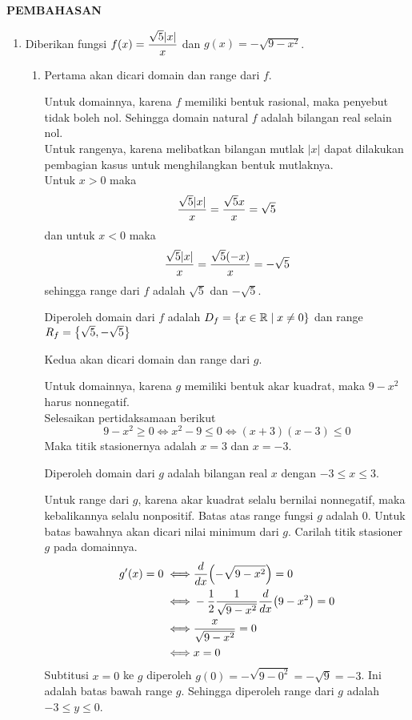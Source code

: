 \begin{center}
\textbf{\large{PEMBAHASAN}}
\end{center}
\begin{enumerate}[leftmargin=*, label={\arabic*}.]
\item Diberikan fungsi $\ds f(x) = \frac{\sqrt{5}\abs{x}}{x}$ dan $g(x) = -\sqrt{9-x^{2}}$.
    \begin{enumerate}[label={\alph*}.]
    \item Pertama akan dicari domain dan range dari $f$.
    
    Untuk domainnya, karena $f$ memiliki bentuk rasional, maka penyebut tidak boleh nol. 
    Sehingga domain natural $f$ adalah bilangan real selain nol.\\
    Untuk rangenya, karena melibatkan bilangan mutlak $|x|$ dapat dilakukan pembagian 
    kasus untuk menghilangkan bentuk mutlaknya.\\
    Untuk $x>0$ maka
    \[
        \frac{\sqrt{5}\abs{x}}{x} = \frac{\sqrt{5}x}{x} = \sqrt{5}
    \]
    dan untuk $x < 0$ maka
    \[
        \frac{\sqrt{5}\abs{x}}{x} = \frac{\sqrt{5}(-x)}{x} = -\sqrt{5}
    \]
    sehingga range dari $f$ adalah $\sqrt{5}$ dan $-\sqrt{5}$.

    Diperoleh domain dari $f$ adalah $D_f=\set*{x\in \mathbb{R} \mid x\neq 0}$ dan 
    range $R_f=\set*{\sqrt{5},-\sqrt{5}}$

    Kedua akan dicari domain dan range dari $g$.

    Untuk domainnya, karena $g$ memiliki bentuk akar kuadrat, maka $9-x^{2}$ harus nonnegatif.\\
    Selesaikan pertidaksamaan berikut
    \[
        9-x^{2} \geq 0 \iff x^{2}-9 \leq 0 \iff (x+3)(x-3) \leq 0
    \]
    Maka titik stasionernya adalah $x=3$ dan $x=-3$.

    
    
    Diperoleh domain dari $g$ adalah bilangan real $x$ dengan $-3 \leq x \leq 3$.

    Untuk range dari $g$, karena akar kuadrat selalu bernilai nonnegatif, maka kebalikannya selalu 
    nonpositif. Batas atas range fungsi $g$ adalah $0$. Untuk batas bawahnya akan dicari nilai minimum 
    dari $g$. Carilah titik stasioner $g$ pada domainnya.
    \begin{align*}
        g'(x) = 0 \iff &\drv{x}{-\sqrt{9-x^{2}}} = 0\\
        \iff &-\frac{1}{2}\frac{1}{\sqrt{9-x^{2}}}\drv{x}{9-x^{2}}=0\\
        \iff &\frac{x}{\sqrt{9-x^{2}}} = 0\\
        \iff & x=0
    \end{align*}
    Subtitusi $x=0$ ke $g$ diperoleh $g(0) = -\sqrt{9-0^{2}} = -\sqrt{9}=-3$. Ini adalah batas 
    bawah range $g$. Sehingga diperoleh range dari $g$ adalah $-3 \leq y \leq 0$.


\end{enumerate}
\end{enumerate}
